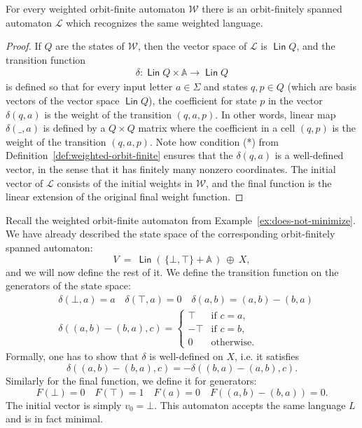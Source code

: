 \documentclass[10pt,a4paper]{amsart}
\numberwithin{equation}{section}
\newcommand{\set}[1]{\{#1\}}
\newcommand{\Ll}{{\mathcal L}}
\newcommand{\Ww}{{\mathcal W}}
\newcommand{\atoms}{\mathbb A}
\DeclareMathOperator{\lin}{\mathsf{Lin}}
\newcommand{\red}[1]{#1}
\newcommand{\blue}[1]{#1}
\begin{document}
\begin{lemma}\label{lem:weighted-to-linear}
    For every weighted orbit-finite automaton $\Ww$ there is an orbit-finitely spanned automaton $\Ll$ which recognizes the same weighted language.
\end{lemma}
\begin{proof}
 If $Q$ are the states of $\Ww$, then the vector space of $\Ll$  is $\lin Q$, and the transition function
    \begin{align*}
    \delta : \lin Q \times \atoms \to \lin Q
    \end{align*}
    is defined so that for every input letter $a \in \Sigma$ and states $q,p \in Q$ (which are basis vectors of the vector space $\lin Q$), the coefficient for state $p$ in the vector $\delta(q,a)$ is the weight of the transition $(q,a,p)$.
    In other words, linear map $\delta(\_,a)$ is defined by a $Q \times Q$ matrix where the coefficient in a cell $(q,p)$ is the weight of the transition $(q,a,p)$.
    Note how condition (*) from Definition~\ref{def:weighted-orbit-finite} ensures that the $\delta(q,a)$ is a well-defined vector, in the sense that it has finitely many nonzero coordinates. The initial vector of $\Ll$ consists of the initial weights in $\Ww$, and the final function is the linear extension of the original final weight function.
\end{proof}

\begin{example}
    Recall the weighted orbit-finite automaton from Example~\ref{ex:does-not-minimize}.
    We have already described the state space of the corresponding orbit-finitely spanned automaton:
    \[ V \ = \ \blue{\lin(\,\set{\bot, \top} + \atoms\,)} \ \oplus\  \red{X} , \]
    and we will now define the rest of it.
    We define the transition function on the generators of the state space:
    \begin{align*}
    &\delta(\blue{\bot}, a) = \blue{a} \quad \delta(\blue{\top}, a) = 0 \quad \delta(\blue{a},b) = \red{(a,b) - (b,a)}
    \\ &\delta(\red{(a,b) - (b,a)}, c) = \begin{cases}
        \blue{\top} & \text{if $c=a$,} \\
        \blue{-\top} & \text{if $c=b$,} \\
        0 & \text{otherwise.}
    \end{cases}
    \end{align*}
    Formally, one has to show that $\delta$ is well-defined on $\red{X}$, i.e. it satisfies 
    \[\delta(\red{(a,b) - (b,a)}, c) = -\delta(\red{(b,a) - (a,b)}, c).\]
    Similarly for the final function, we define it for generators:
    \[ F(\blue{\bot}) = 0 \quad F(\blue{\top}) = 1 \quad F(\blue{a}) = 0 \quad F(\red{(a,b) - (b,a)}) = 0 . \]
    The initial vector is simply $v_0 = \blue{\bot}$.
    This automaton accepts the same language $L$ and is in fact minimal.
\end{example}
\end{document}
